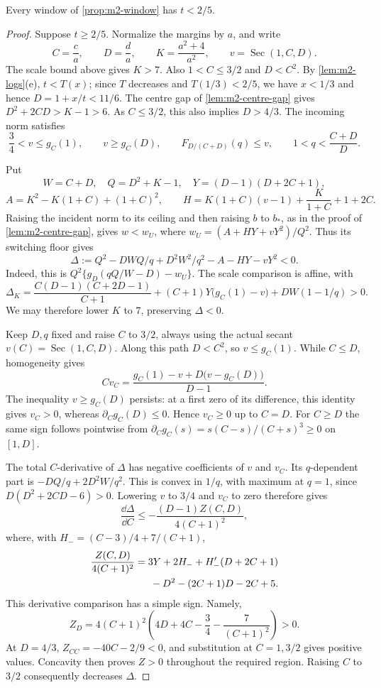 \begin{lemma}\label{lem:m2-high-t}
Every window of \cref{prop:m2-window} has $t<2/5$.
\end{lemma}

\begin{proof}
Suppose $t\ge2/5$. Normalize the margins by $a$, and write
\[
 C=\frac ca,\qquad D=\frac da,\qquad K=\frac{a^2+4}{a^2},\qquad
 v=\operatorname{Sec}(1,C,D).
\]
The scale bound above gives $K>7$. Also $1<C\le3/2$ and $D<C^2$.
By \cref{lem:m2-logs}(e), $t<T(x)$; since $T$ decreases and
$T(1/3)<2/5$, we have $x<1/3$ and hence $D=1+x/t<11/6$.
The centre gap of \cref{lem:m2-centre-gap} gives
$D^2+2CD>K-1>6$. As $C\le3/2$, this also implies $D>4/3$.
The incoming norm satisfies
\[
 \frac34<v\le g_C(1),\qquad v\ge g_C(D),\qquad
 F_{D/(C+D)}(q)\le v,\qquad 1<q<\frac{C+D}{D}.
\]

Put
\[
 W=C+D,\quad Q=D^2+K-1,\quad Y=(D-1)(D+2C+1),
\]
\[
 A=K^2-K(1+C)+(1+C)^2,\qquad
 H=K(1+C)(v-1)+\frac K{1+C}+1+2C.
\]
Raising the incident norm to its ceiling and then raising $b$ to $b_*$,
as in the proof of \cref{lem:m2-centre-gap}, gives $w<w_U$, where $w_U=(A+HY+vY^2)/Q^2$.
Thus its switching floor gives
\[
 \Delta:=Q^2-DWQ/q+D^2W^2/q^2-A-HY-vY^2<0.
\]
Indeed, this is $Q^2\{g_D(qQ/W-D)-w_U\}$.
The scale comparison is affine, with
\[
 \Delta_K=\frac{C(D-1)(C+2D-1)}{C+1}
 +(C+1)Y\bigl(g_C(1)-v\bigr)+DW(1-1/q)>0.
\]
We may therefore lower $K$ to $7$, preserving $\Delta<0$.

Keep $D,q$ fixed and raise $C$ to $3/2$, always using the actual secant
$v(C)=\operatorname{Sec}(1,C,D)$. Along this path $D<C^2$, so
$v\le g_C(1)$. While $C\le D$, homogeneity gives
\[
 C v_C=\frac{g_C(1)-v+D\bigl(v-g_C(D)\bigr)}{D-1}.
\]
The inequality $v\ge g_C(D)$ persists: at a first zero of its difference,
this identity gives $v_C>0$, whereas $\partial_Cg_C(D)\le0$.
Hence $v_C\ge0$ up to $C=D$. For $C\ge D$ the same sign follows
pointwise from $\partial_Cg_C(s)=s(C-s)/(C+s)^3\ge0$ on $[1,D]$.

The total $C$-derivative of $\Delta$ has negative coefficients of $v$
and $v_C$. Its $q$-dependent part is $-DQ/q+2D^2W/q^2$.
This is convex in $1/q$, with maximum at $q=1$, since
$D(D^2+2CD-6)>0$. Lowering $v$ to $3/4$ and $v_C$ to zero therefore gives
\[
 \frac{\dd\Delta}{\dd C}\le-\frac{(D-1)Z(C,D)}{4(C+1)^2},
\]
where, with $H_-=(C-3)/4+7/(C+1)$,
\begin{multline*}
 \frac{Z(C,D)}{4(C+1)^2}
 =3Y+2H_-+H_-'(D+2C+1)\\
 \hfill{}-D^2-(2C+1)D-2C+5.
\end{multline*}
This derivative comparison has a simple sign. Namely,
\[
 Z_D=4(C+1)^2\left(4D+4C-\frac34-\frac7{(C+1)^2}\right)>0.
\]
At $D=4/3$, $Z_{CC}=-40C-2/9<0$, and substitution at $C=1,3/2$
gives positive values. Concavity then proves $Z>0$ throughout the
required region. Raising $C$ to $3/2$ consequently decreases $\Delta$.


\end{proof}
